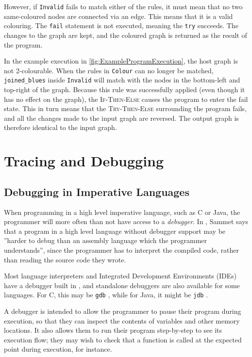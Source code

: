 \documentclass[authoryearcitations]{UoYCSproject}
\begin{document}
However, if \texttt{Invalid} fails to match either of the rules, it must mean
that no two same-coloured nodes are connected via an edge. This means that it is
a valid colouring. The \texttt{fail} statement is not executed, meaning the
\texttt{try} succeeds. The changes to the graph are kept, and the coloured graph
is returned as the result of the program.

In the example execution in \autoref{fig:ExampleProgramExecution}, the host graph
is not 2-colourable. When the rules in \texttt{Colour} can no longer be matched,
\texttt{joined\_blues} inside \texttt{Invalid} will match with the nodes in the
bottom-left and top-right of the graph. Because this rule was successfully applied
(even though it has no effect on the graph), the \textsc{If-Then-Else} causes the
program to enter the fail state. This in turn means that the \textsc{Try-Then-Else}
surrounding the program fails, and all the changes made to the input graph are
reversed. The output graph is therefore identical to the input graph.


\section{Tracing and Debugging}
\label{sec:TracingAndDebugging}

\subsection{Debugging in Imperative Languages}
\label{sec:DebuggingInImperativeLanguages}

When programming in a high level imperative language, such as C or Java, the
programmer will more often than not have access to a \emph{debugger}. In
\citep{sammet1969}, Sammet says that a program in a high level language without
debugger support may be ''harder to debug than an assembly language which the
programmer understands'', since the programmer has to interpret the compiled code,
rather than reading the source code they wrote.

Most language interpreters and Integrated Development Environments (IDEs) have a
debugger built in \citep{scott2009}, and standalone debuggers are also available
for some languages. For C, this may be \texttt{gdb} \citep{gdbsite}, while for
Java, it might be \texttt{jdb} \citep{jdbsite}. 

A debugger is intended to allow the programmer to pause their program during
execution, so that they can inspect the contents of variables and other memory
locations. It also allows them to run their program step-by-step to see its
execution flow; they may wish to check that a function is called at the expected
point during execution, for instance.
\end{document}
